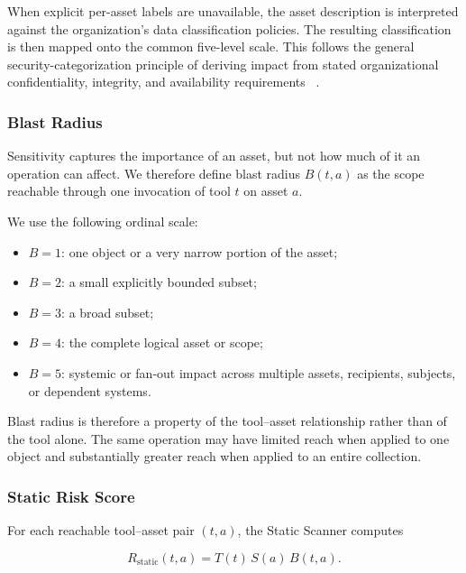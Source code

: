 \documentclass[sigconf]{acmart}
\begin{document}
When explicit per-asset labels are unavailable, the asset description
is interpreted against the organization's data classification policies. The resulting
classification is then mapped onto the common five-level scale. This follows
the general security-categorization principle of deriving impact from stated
organizational confidentiality, integrity, and availability requirements
~\cite{nist2004fips199,nist2008sp80060}.


\subsubsection{Blast Radius}
\label{sec:blast}

Sensitivity captures the importance of an asset, but not how much of it an
operation can affect. We therefore define blast radius $B(t,a)$ as the scope
reachable through one invocation of tool $t$ on asset $a$.

We use the following ordinal scale:

\begin{itemize}
    \item $B=1$: one object or a very narrow portion of the asset;
    \item $B=2$: a small explicitly bounded subset;
    \item $B=3$: a broad subset;
    \item $B=4$: the complete logical asset or scope;
    \item $B=5$: systemic or fan-out impact across multiple assets,
          recipients, subjects, or dependent systems.
\end{itemize}

Blast radius is therefore a property of the tool--asset relationship rather
than of the tool alone. The same operation may have limited reach when applied
to one object and substantially greater reach when applied to an entire
collection.


\subsubsection{Static Risk Score}
\label{sec:static-score}

For each reachable tool--asset pair $(t,a)$, the Static Scanner computes

\begin{equation}
R_{\mathrm{static}}(t,a)
=
T(t)\,S(a)\,B(t,a).
\label{eq:static-risk}
\end{equation}
\end{document}
